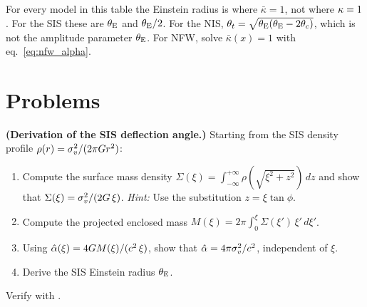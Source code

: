\begin{annotation}[Einstein radius vs ``$\kappab = 1$'' radius]
For every model in this table the Einstein radius is where $\bar\kappa = 1$,
not where $\kappab = 1$.  For the SIS these are $\theta_{\mathrm{E}}$ and $\theta_{\mathrm{E}}/2$.
For the NIS, $\theta_t = \sqrt{\theta_{\mathrm{E}}(\theta_{\mathrm{E}}-2\theta_c)}$, which is not the
amplitude parameter $\theta_{\mathrm{E}}$.  For NFW, solve $\bar\kappa(x) = 1$ with
eq.~\eqref{eq:nfw_alpha}.
\end{annotation}


\section{Problems}
\label{sec:axi_problems}

\begin{exercise}
\label{ex:sis_deflection_derivation}
\textbf{(Derivation of the SIS deflection angle.)}
Starting from the SIS density profile $\rho(r) = \sigma_v^2/(2\pi
G r^2)$:
\begin{enumerate}[label=(\alph*)]
    \item Compute the surface mass density
          $\Sigma(\xi) = \int_{-\infty}^{+\infty}
          \rho(\sqrt{\xi^2 + z^2})\, dz$ and show that
          $\Sigma(\xi) = \sigma_v^2 / (2G\,\xi)$.
          \textit{Hint:} Use the substitution $z = \xi\tan\phi$.
    \item Compute the projected enclosed mass
          $M(\xi) = 2\pi \int_0^\xi \Sigma(\xi')\,\xi'\,d\xi'$.
    \item Using $\hat{\alpha}(\xi) = 4G M(\xi) /
          (c^2\,\xi)$, show that
          $\hat{\alpha} = 4\pi\sigma_v^2/c^2$, independent of
          $\xi$.
    \item Derive the SIS Einstein radius $\theta_{\mathrm{E}}$.
\end{enumerate}
Verify with
.
\end{exercise}

